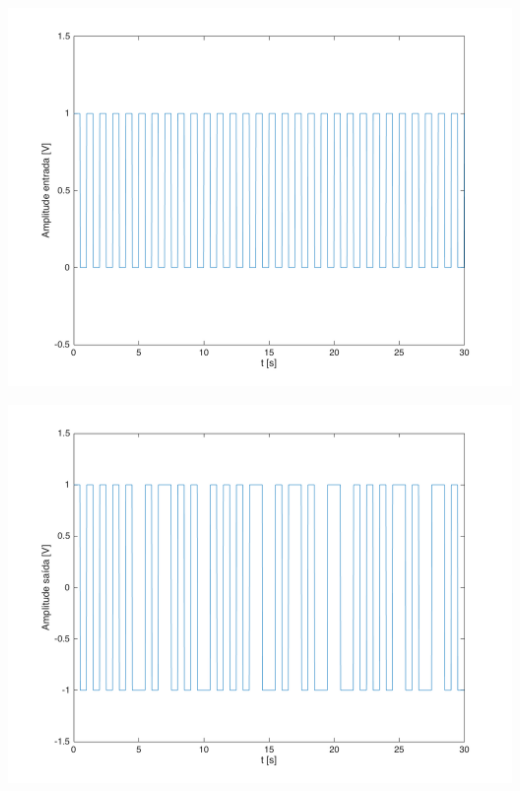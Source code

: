 \documentclass[a4paper,11pt]{report}
\begin{document}
\begin{minipage}[t]{0.5\textwidth}
  \includegraphics[angle=0,width=1\textwidth]{grafico_5_1_5.png}
     \label{fig:grafico_5_1_5}
     \end{minipage}%
\hspace{0.3cm}
\begin{minipage}[t]{0.5\textwidth}
  \includegraphics[angle=0,width=1\textwidth]{grafico_5_1_6.png}
     \label{fig:grafico_5_1_6}
     \end{minipage}\\
     
\end{document}
